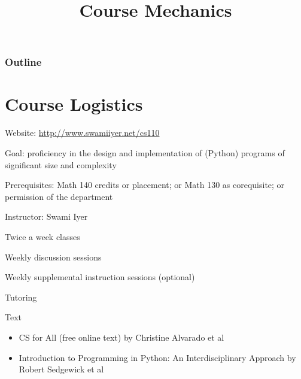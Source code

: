 \documentclass[8pt,a4paper,compress]{beamer}
\title{Course Mechanics}
\date{}
\begin{document}
\begin{frame}
\vfill
\titlepage
\end{frame}

\begin{frame}
\frametitle{Outline}
\tableofcontents
\end{frame}

\section{Course Logistics}
\begin{frame}[fragile]
Website: \href{http://www.swamiiyer.net/cs110}{http://www.swamiiyer.net/cs110}

\bigskip

Goal: proficiency in the design and implementation of (Python) programs of significant size and complexity

\bigskip

Prerequisites: Math 140 credits or placement; or Math 130 as corequisite; or permission of the department

\bigskip

Instructor: Swami Iyer

\bigskip

Twice a week classes

\bigskip
Weekly discussion sessions

\bigskip

Weekly supplemental instruction sessions (optional)

\bigskip

Tutoring

\bigskip

Text
\begin{itemize}
\item CS for All (free online text) by Christine Alvarado et al
\item Introduction to Programming in Python: An Interdisciplinary Approach by Robert Sedgewick et al
\end{itemize}
\end{frame}
\end{document}
